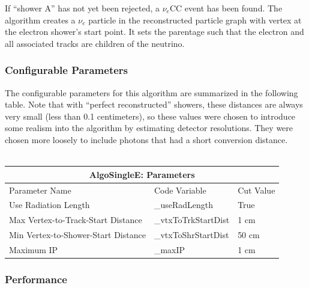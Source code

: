 If ``shower A'' has not yet been rejected, a $\nu_e$CC event has been found. The algorithm creates a $\nu_e$ particle in the reconstructed particle graph with vertex at the electron shower's start point. It sets the parentage such that the electron and all associated tracks are children of the neutrino.

\subsubsection{Configurable Parameters}
The configurable parameters for this algorithm are summarized in the following table. Note that with ``perfect reconstructed'' showers, these distances are always very small (less than 0.1 centimeters), so these values were chosen to introduce some realism into the algorithm by estimating detector resolutions. They were chosen more loosely to include photons that had a short conversion distance.\\\\

\begin{center}
\begin{tabular}{ |p{8cm}|p{3.5cm}|p{1.5cm}|  }
 \hline
 \multicolumn{3}{|c|}{AlgoSingleE: Parameters} \\
 \hline
 Parameter Name & Code Variable & Cut Value \\
 \hline \hline
 Use Radiation Length & \_useRadLength & True\\\hline
 
 Max Vertex-to-Track-Start Distance & \_vtxToTrkStartDist & 1 cm \\\hline

 Min Vertex-to-Shower-Start Distance & \_vtxToShrStartDist & 50 cm \\\hline

 Maximum IP & \_maxIP & 1 cm \\\hline

 \hline
\end{tabular}\label{algosinglee_table}
\end{center}


\subsubsection{Performance}

